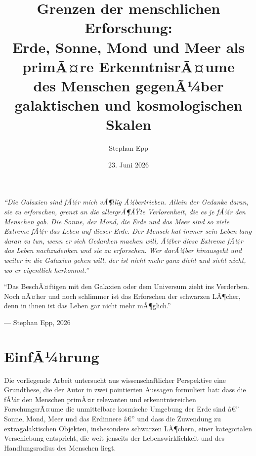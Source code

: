 ﻿\documentclass[a4paper,12pt]{article}
\title{\textbf{Grenzen der menschlichen Erforschung:}\\[0.4em]
\large Erde, Sonne, Mond und Meer als primÃ¤re ErkenntnisrÃ¤ume\\
des Menschen gegenÃ¼ber galaktischen und kosmologischen Skalen}
\author{Stephan Epp}
\date{23. Juni 2026}
\theoremstyle{definition}
\begin{document}
\maketitle

\bigskip

\begin{center}
\begin{minipage}{0.88\textwidth}
\itshape
\small
\enquote{Die Galaxien sind fÃ¼r mich vÃ¶llig Ã¼bertrieben. Allein der Gedanke daran,
sie zu erforschen, grenzt an die allergrÃ¶ÃŸte Verlorenheit, die es je fÃ¼r den
Menschen gab. Die Sonne, der Mond, die Erde und das Meer sind so viele Extreme
fÃ¼r das Leben auf dieser Erde. Der Mensch hat immer sein Leben lang daran zu tun,
wenn er sich Gedanken machen will, Ã¼ber diese Extreme fÃ¼r das Leben nachzudenken
und sie zu erforschen. Wer darÃ¼ber hinausgeht und weiter in die Galaxien gehen
will, der ist nicht mehr ganz dicht und sieht nicht, wo er eigentlich herkommt.}

\medskip

\enquote{Das BeschÃ¤ftigen mit den Galaxien oder dem Universum zieht ins Verderben.
Noch nÃ¤her und noch schlimmer ist das Erforschen der schwarzen LÃ¶cher, denn in
ihnen ist das Leben gar nicht mehr mÃ¶glich.}

\smallskip
\hfill --- \textup{Stephan Epp}, 2026
\end{minipage}
\end{center}

\bigskip

\tableofcontents
\newpage

\section{EinfÃ¼hrung}

Die vorliegende Arbeit untersucht aus wissenschaftlicher Perspektive eine
Grundthese, die der Autor in zwei pointierten Aussagen formuliert hat: dass die
fÃ¼r den Menschen primÃ¤r relevanten und erkenntnisreichen ForschungsrÃ¤ume die
unmittelbare kosmische Umgebung der Erde sind â€” Sonne, Mond, Meer und das
Erdinnere â€” und dass die Zuwendung zu extragalaktischen Objekten, insbesondere
schwarzen LÃ¶chern, einer kategorialen Verschiebung entspricht, die weit jenseits
der Lebenswirklichkeit und des Handlungsradius des Menschen liegt.
\end{document}
